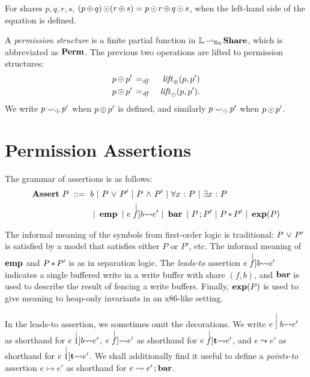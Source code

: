 \documentclass[11pt]{report}
\begin{document}
\begin{lemma}
	\label{lem:share-exchange}
	For shares $p,q,r,s$, $(p \operatorname{\oplus} q) \operatorname{\odot} (r \operatorname{\oplus} s) = p \operatorname{\odot} r \operatorname{\oplus} q \operatorname{\odot} s$, when the left-hand side of the equation is defined.  
\end{lemma}

A \emph{permission structure} is a finite partial function in $\mathbb{L} \operatorname{\operatorname{\rightharpoonup}_{\mathrm{fin}}} \mathbf{Share}$, which is abbreviated as $\mathbf{Perm}$. The previous two operations are lifted to permission structures: \begin{eqnarray*}
	p \operatorname{\oplus} p' & \operatorname{\;=_{\mathit{df}}\;} & \mathit{lift}_{\operatorname{\oplus}}(p,p') \\
	p \operatorname{\odot} p' & \operatorname{\;=_{\mathit{df}}\;} & \mathit{lift}_{\operatorname{\odot}}(p,p').
\end{eqnarray*} We write $p \operatorname{\smile}_{\operatorname{\oplus}} p'$ when $p \operatorname{\oplus} p'$ is defined, and similarly $p \operatorname{\smile}_{\operatorname{\odot}} p'$ when $p \operatorname{\odot} p'$. 

\section{Permission Assertions} %
\label{sec:permission-assertions}

The grammar of assertions is as follows: 
\begin{align*}
	\mathbf{Assert}~P ~::=~ {} & b ~|~ P \operatorname{\,\vee\,} P' ~|~ P \operatorname{\,\wedge\,} P' ~|~ \forall x \operatorname{\,:\,} P ~|~ \exists x \operatorname{\,:\,} P \\
	&  ~|~ \operatorname{\mathbf{emp}} ~|~ e \stackrel[f]{b}{\leadsto} e' ~|~ \operatorname{\mathbf{bar}} ~|~ P \operatorname{;} P' ~|~ P \operatorname{\ast} P' ~|~ \operatorname{\mathbf{exp}}(P)
\end{align*} 

The informal meaning of the symbols from first-order logic is traditional: $P \operatorname{\,\vee\,} P'$ is satisfied by a model that satisfies either $P$ or $P'$, etc. The informal meaning of $\operatorname{\mathbf{emp}}$ and $P \operatorname{\ast} P'$ is as in separation logic. The \emph{leads-to} assertion $e \stackrel[f]{b}{\leadsto} e'$ indicates a single buffered write in a write buffer with share $(f,b)$, and $\operatorname{\mathbf{bar}}$ is used to describe the result of fencing a write buffers. Finally, $\operatorname{\mathbf{exp}}(P)$ is used to give meaning to heap-only invariants in an x86-like setting.

In the leads-to assertion, we sometimes omit the decorations. We write $e \stackrel[]{b}{\leadsto} e'$ as shorthand for $e \stackrel[1]{b}{\leadsto} e'$, $e \stackrel[f]{}{\leadsto} e'$ as shorthand for $e \stackrel[f]{\ensuremath{\mathbf{t}}}{\leadsto} e'$, and $e \leadsto e'$ as shorthand for $e \stackrel[1]{\ensuremath{\mathbf{t}}}{\leadsto} e'$. We shall additionally find it useful to define a \emph{points-to} assertion $e \mapsto e'$ as shorthand for $e \leadsto e' \operatorname{;} \operatorname{\mathbf{bar}}$. 
\end{document}
